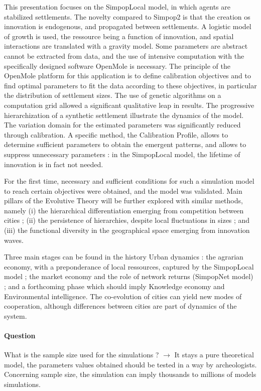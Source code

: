 \documentclass[11pt]{article}
\begin{document}
This presentation focuses on the SimpopLocal model, in which agents are stabilized settlements. The novelty compared to Simpop2 is that the creation os innovation is endogenous, and propagated between settlements. A logistic model of growth is used, the ressource being a function of innovation, and spatial interactions are translated with a gravity model. Some parameters are abstract cannot be extracted from data, and the use of intensive computation with the specifically designed software OpenMole is necessary. The principle of the OpenMole platform for this application is to define calibration objectives and to find optimal parameters to fit the data according to these objectives, in particular the distribution of settlement sizes. The use of genetic algorithms on a computation grid allowed a significant qualitative leap in results. The progressive hierarchization of a synthetic settlement illustrate the dynamics of the model. The variation domain for the estimated parameters was significantly reduced through calibration. A specific method, the Calibration Profile, allows to determine sufficient parameters to obtain the emergent patterns, and allows to suppress unnecessary parameters : in the SimpopLocal model, the lifetime of innovation is in fact not needed.

For the first time, necessary and sufficient conditions for such a simulation model to reach certain objectives were obtained, and the model was validated. Main pillars of the Evolutive Theory will be further explored with similar methods, namely (i) the hierarchical differentiation emerging from competition between cities ; (ii) the persistence of hierarchies, despite local fluctuations in sizes ; and (iii) the functional diversity in the geographical space emerging from innovation waves.

Three main stages can be found in the history Urban dynamics : the agrarian economy, with a preponderance of local ressources, captured by the SimpopLocal model ; the market economy and the role of network returns (SimpopNet model) ; and a forthcoming phase which should imply Knowledge economy and Environmental intelligence. The co-evolution of cities can yield new modes of cooperation, although differences between cities are part of dynamics of the system.


\paragraph{Question}

What is the sample size used for the simulations ? $\rightarrow$ It stays a pure theoretical model, the parameters values obtained should be tested in a way by archeologists. Concerning sample size, the simulation can imply thousands to millions of models simulations.
\end{document}
